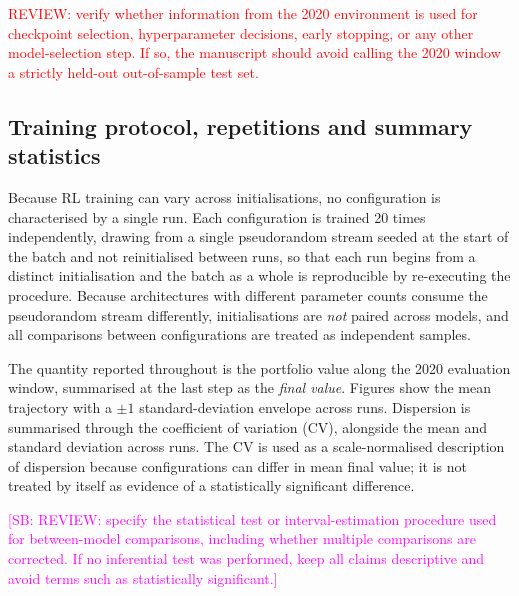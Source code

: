 \documentclass[aps,floatfix,superscriptaddress,twocolumn,tightenlines,amsmath,amssymb,nofootinbib,10pt,longbibliography,prl]{revtex4-2}
\newcommand{\sam}[1]{\textcolor{magenta}{[SB: {#1}]}}
\begin{document}
\textcolor{red}{REVIEW: verify whether information from the 2020 environment is
used for checkpoint selection, hyperparameter decisions, early stopping, or any other
model-selection step. If so, the manuscript should avoid calling the 2020 window a strictly
held-out out-of-sample test set.}

\subsection{Training protocol, repetitions and summary statistics}
\label{subsec:protocol}

Because RL training can vary across initialisations, no configuration is characterised by a
single run. Each configuration is trained \num{20} times independently, drawing from a
single pseudorandom stream seeded at the start of the batch and not reinitialised between
runs, so that each run begins from a distinct initialisation and the batch as a whole is
reproducible by re-executing the procedure. Because architectures with different parameter
counts consume the pseudorandom stream differently, initialisations are \emph{not} paired
across models, and all comparisons between configurations are treated as independent
samples.

The quantity reported throughout is the portfolio value along the 2020 evaluation window,
summarised at the last step as the \emph{final value}. Figures show the mean trajectory with
a $\pm 1$ standard-deviation envelope across runs. Dispersion is summarised through the
coefficient of variation (CV), alongside the mean and standard deviation across runs. The CV
is used as a scale-normalised description of dispersion because configurations can differ in
mean final value; it is not treated by itself as evidence of a statistically significant
difference.

\sam{REVIEW: specify the statistical test or interval-estimation procedure used for between-model comparisons, including whether multiple comparisons are corrected. If no inferential test was performed, keep all claims descriptive and avoid terms
such as statistically significant.}
\end{document}
